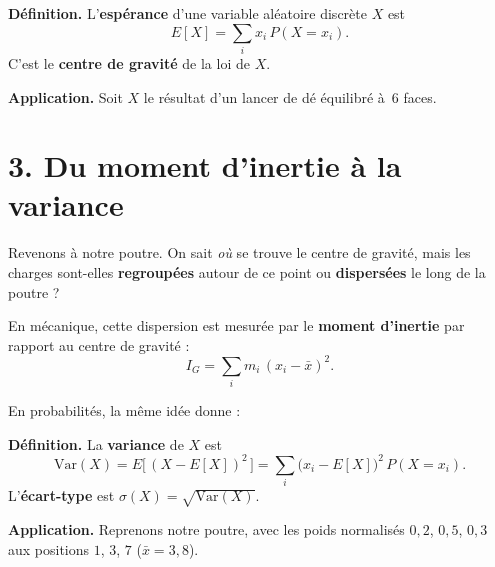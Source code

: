 \begin{mdframed}[backgroundcolor=ThemeLight, linecolor=Theme,
  linewidth=1pt, innertopmargin=8pt, innerbottommargin=8pt,
  nobreak=true]
\textbf{Définition.}
L'\textbf{espérance} d'une variable aléatoire discrète $X$ est
\[
  \boxed{E[X] = \sum_{i} x_i \, P(X = x_i).}
\]
C'est le \textbf{centre de gravité} de la loi de $X$.
\end{mdframed}

\medskip

\textbf{Application.}
Soit $X$ le résultat d'un lancer de dé équilibré à~$6$ faces.


\section*{3. Du moment d'inertie à la variance}

Revenons à notre poutre.
On sait \emph{où} se trouve le centre de gravité,
mais les charges sont-elles \textbf{regroupées}
autour de ce point ou \textbf{dispersées}
le long de la poutre ?

\medskip

En mécanique, cette dispersion est mesurée par le
\textbf{moment d'inertie} par rapport au centre de gravité :
\[
  I_G = \sum_{i} m_i \,(x_i - \bar{x})^2.
\]

En probabilités, la même idée donne :

\begin{mdframed}[backgroundcolor=ThemeLight, linecolor=Theme,
  linewidth=1pt, innertopmargin=8pt, innerbottommargin=8pt]
\textbf{Définition.}
La \textbf{variance} de $X$ est
\[
  \boxed{\text{Var}(X)
  = E\!\Big[\,(X - E[X])^2\,\Big]
  = \sum_i \bigl(x_i - E[X]\bigr)^2 \, P(X = x_i).}
\]
L'\textbf{écart-type} est $\sigma(X) = \sqrt{\text{Var}(X)}$.
\end{mdframed}

\medskip

\textbf{Application.}
Reprenons notre poutre, avec les poids normalisés
$0{,}2$, $0{,}5$, $0{,}3$ aux positions $1$, $3$, $7$
($\bar{x} = 3{,}8$).

